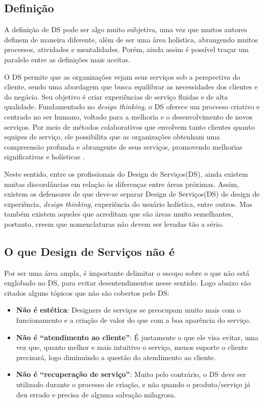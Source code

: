 \subsection{Definição}

A definição de DS pode ser algo muito subjetiva, uma vez que muitos autores definem de maneira diferente, além de ser uma área holística, abrangendo muitos processos, atividades e mentalidades. Porém, ainda assim é possível traçar um paralelo entre as definições mais aceitas.

O DS permite que as organizações vejam seus serviços sob a perspectiva do cliente, sendo uma abordagem que busca equilibrar as necessidades dos clientes e do negócio. Seu objetivo é criar experiências de serviço fluidas e de alta qualidade. Fundamentado no \textit{design thinking}, o DS oferece um processo criativo e centrado no ser humano, voltado para a melhoria e o desenvolvimento de novos serviços. Por meio de métodos colaborativos que envolvem tanto clientes quanto equipes de serviço, ele possibilita que as organizações obtenham uma compreensão profunda e abrangente de seus serviços, promovendo melhorias significativas e holísticas \cite{Stickdorn2019}.

Neste sentido, entre os profissionais do Design de Serviços(DS), ainda existem muitas discordâncias em relação às diferenças entre áreas próximas. Assim, existem os defensores de que deve-se separar Design de Serviços(DS) de design de experiência, \textit{design thinking}, experiência do usuário holística, entre outros. Mas também existem aqueles que acreditam que são áreas muito semelhantes, portanto, creem que nomenclaturas não devem ser levadas tão a sério.

\subsection{O que Design de Serviços não é}

Por ser uma área ampla, é importante delimitar o escopo sobre o que não está englobado no DS, para evitar desentendimentos nesse sentido. Logo abaixo são citados alguns tópicos que não são cobertos pelo DS:

\begin{itemize}
	\item \textbf{Não é estética}: Designers de serviços se preocupam muito mais com o funcionamento e a criação de valor do que com a boa aparência do serviço.
	
	\item \textbf{Não é ``atendimento ao cliente''}: É justamente o que ele visa evitar, uma vez que, quanto melhor e mais intuitivo o serviço, menos suporte o cliente precisará, logo diminuindo a questão do atendimento ao cliente.
	
	\item \textbf{Não é ``recuperação de serviço''}: Muito pelo contrário, o DS deve ser utilizado durante o processo de criação, e não quando o produto/serviço já deu errado e precisa de alguma salvação milagrosa.
\end{itemize}

